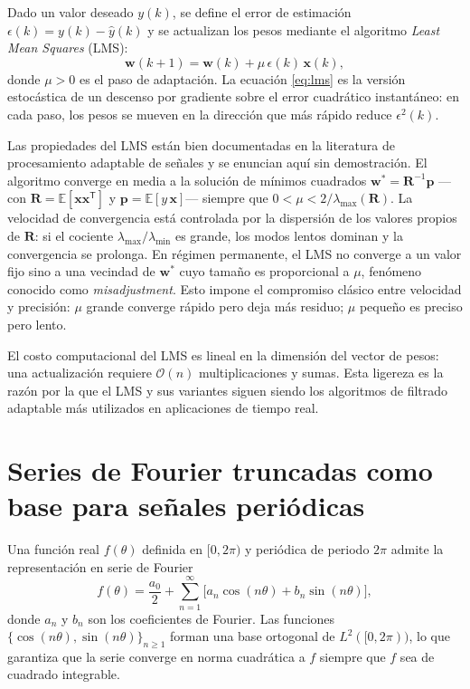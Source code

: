 \documentclass[../../../Tesis_JALS_Maestria.tex]{subfiles}
\begin{document}
Dado un valor deseado $y(k)$, se define el error de estimación $\epsilon(k) = y(k) - \hat{y}(k)$ y se actualizan los pesos mediante el algoritmo \textit{Least Mean Squares} (LMS):
\begin{equation}
    \mathbf{w}(k+1) = \mathbf{w}(k) + \mu\,\epsilon(k)\,\mathbf{x}(k),
    \label{eq:lms}
\end{equation}
donde $\mu > 0$ es el paso de adaptación. La ecuación \eqref{eq:lms} es la versión estocástica de un descenso por gradiente sobre el error cuadrático instantáneo: en cada paso, los pesos se mueven en la dirección que más rápido reduce $\epsilon^2(k)$.

Las propiedades del LMS están bien documentadas en la literatura de procesamiento adaptable de señales \citep{widrow1976lms, widrow1985adaptive, haykin2014adaptive} y se enuncian aquí sin demostración. El algoritmo converge en media a la solución de mínimos cuadrados $\mathbf{w}^* = \mathbf{R}^{-1}\mathbf{p}$ ---con $\mathbf{R} = \mathbb{E}[\mathbf{x}\mathbf{x}^{\mathsf T}]$ y $\mathbf{p} = \mathbb{E}[y\,\mathbf{x}]$--- siempre que $0 < \mu < 2/\lambda_{\max}(\mathbf{R})$. La velocidad de convergencia está controlada por la dispersión de los valores propios de $\mathbf{R}$: si el cociente $\lambda_{\max}/\lambda_{\min}$ es grande, los modos lentos dominan y la convergencia se prolonga. En régimen permanente, el LMS no converge a un valor fijo sino a una vecindad de $\mathbf{w}^*$ cuyo tamaño es proporcional a $\mu$, fenómeno conocido como \textit{misadjustment}. Esto impone el compromiso clásico entre velocidad y precisión: $\mu$ grande converge rápido pero deja más residuo; $\mu$ pequeño es preciso pero lento.

El costo computacional del LMS es lineal en la dimensión del vector de pesos: una actualización requiere $\mathcal{O}(n)$ multiplicaciones y sumas. Esta ligereza es la razón por la que el LMS y sus variantes siguen siendo los algoritmos de filtrado adaptable más utilizados en aplicaciones de tiempo real.

\section{Series de Fourier truncadas como base para señales periódicas}
\label{sec:fourier}

Una función real $f(\theta)$ definida en $[0, 2\pi)$ y periódica de periodo $2\pi$ admite la representación en serie de Fourier
\begin{equation}
    f(\theta) = \frac{a_0}{2} + \sum_{n=1}^{\infty}\bigl[a_n \cos(n\theta) + b_n \sin(n\theta)\bigr],
    \label{eq:fourier-completa}
\end{equation}
donde $a_n$ y $b_n$ son los coeficientes de Fourier. Las funciones $\{\cos(n\theta), \sin(n\theta)\}_{n \ge 1}$ forman una base ortogonal de $L^2([0,2\pi))$, lo que garantiza que la serie converge en norma cuadrática a $f$ siempre que $f$ sea de cuadrado integrable.
\end{document}
